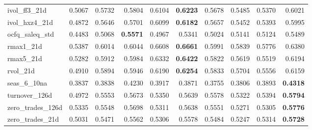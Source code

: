 \begin{longtable}{>{\raggedright\arraybackslash}p{2.6cm}rrrrrrrrr}
ivol\_ff3\_21d & 0.5067 & \cellcolor{blue!10}0.5732 & \cellcolor{blue!10}0.5804 & \cellcolor{blue!10}0.6104 & \textbf{\cellcolor{blue!10}0.6223} & \cellcolor{blue!10}0.5678 & \cellcolor{blue!10}0.5485 & \cellcolor{blue!10}0.5370 & \cellcolor{blue!10}0.6021 \\
ivol\_hxz4\_21d & 0.4872 & \cellcolor{blue!10}0.5646 & \cellcolor{blue!10}0.5701 & \cellcolor{blue!10}0.6099 & \textbf{\cellcolor{blue!10}0.6182} & \cellcolor{blue!10}0.5657 & \cellcolor{blue!10}0.5452 & \cellcolor{blue!10}0.5393 & \cellcolor{blue!10}0.5995 \\
ocfq\_saleq\_std & 0.4483 & \cellcolor{blue!10}0.5068 & \textbf{\cellcolor{blue!10}0.5571} & \cellcolor{blue!10}0.4967 & \cellcolor{blue!10}0.5341 & \cellcolor{blue!10}0.5024 & \cellcolor{blue!10}0.5141 & \cellcolor{blue!10}0.5124 & \cellcolor{blue!10}0.5489 \\
rmax1\_21d & 0.5387 & \cellcolor{blue!10}0.6014 & \cellcolor{blue!10}0.6044 & \cellcolor{blue!10}0.6608 & \textbf{\cellcolor{blue!10}0.6661} & \cellcolor{blue!10}0.5991 & \cellcolor{blue!10}0.5839 & \cellcolor{blue!10}0.5776 & \cellcolor{blue!10}0.6380 \\
rmax5\_21d & 0.5282 & \cellcolor{blue!10}0.5912 & \cellcolor{blue!10}0.5984 & \cellcolor{blue!10}0.6332 & \textbf{\cellcolor{blue!10}0.6422} & \cellcolor{blue!10}0.5822 & \cellcolor{blue!10}0.5619 & \cellcolor{blue!10}0.5519 & \cellcolor{blue!10}0.6194 \\
rvol\_21d & 0.4910 & \cellcolor{blue!10}0.5894 & \cellcolor{blue!10}0.5946 & \cellcolor{blue!10}0.6190 & \textbf{\cellcolor{blue!10}0.6254} & \cellcolor{blue!10}0.5833 & \cellcolor{blue!10}0.5704 & \cellcolor{blue!10}0.5556 & \cellcolor{blue!10}0.6159 \\
seas\_6\_10na & 0.3837 & \cellcolor{blue!10}0.3838 & \cellcolor{blue!10}0.4230 & \cellcolor{blue!10}0.3917 & \cellcolor{blue!10}0.3871 & 0.3755 & 0.3806 & \cellcolor{blue!10}0.3893 & \textbf{\cellcolor{blue!10}0.4318} \\
turnover\_126d & 0.4972 & \cellcolor{blue!10}0.5553 & \cellcolor{blue!10}0.5673 & \cellcolor{blue!10}0.5350 & \cellcolor{blue!10}0.5639 & \cellcolor{blue!10}0.5578 & \cellcolor{blue!10}0.5322 & \cellcolor{blue!10}0.5394 & \textbf{\cellcolor{blue!10}0.5794} \\
zero\_trades\_126d & 0.5335 & \cellcolor{blue!10}0.5548 & \cellcolor{blue!10}0.5698 & 0.5311 & \cellcolor{blue!10}0.5638 & \cellcolor{blue!10}0.5551 & 0.5271 & 0.5305 & \textbf{\cellcolor{blue!10}0.5776} \\
zero\_trades\_21d & 0.5031 & \cellcolor{blue!10}0.5471 & \cellcolor{blue!10}0.5562 & \cellcolor{blue!10}0.5306 & \cellcolor{blue!10}0.5578 & \cellcolor{blue!10}0.5484 & \cellcolor{blue!10}0.5247 & \cellcolor{blue!10}0.5314 & \textbf{\cellcolor{blue!10}0.5728} \\

\end{longtable}
